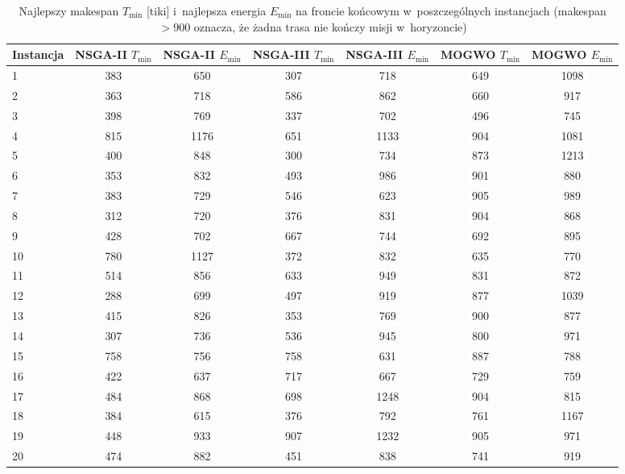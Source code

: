 \begin{table}[htbp]
    \centering
    \caption{Najlepszy makespan $T_{\min}$ [tiki] i~najlepsza energia $E_{\min}$ na froncie końcowym w~poszczególnych instancjach (makespan $> 900$ oznacza, że żadna trasa nie kończy misji w~horyzoncie)}
    \label{tab:per_run_objectives}
    \begin{tabular}{l c c c c c c}
        \hline
        Instancja & NSGA-II $T_{\min}$ & NSGA-II $E_{\min}$ & NSGA-III $T_{\min}$ & NSGA-III $E_{\min}$ & MOGWO $T_{\min}$ & MOGWO $E_{\min}$ \\
        \hline
        1 & 383 & 650 & 307 & 718 & 649 & 1098 \\
        2 & 363 & 718 & 586 & 862 & 660 & 917 \\
        3 & 398 & 769 & 337 & 702 & 496 & 745 \\
        4 & 815 & 1176 & 651 & 1133 & 904 & 1081 \\
        5 & 400 & 848 & 300 & 734 & 873 & 1213 \\
        6 & 353 & 832 & 493 & 986 & 901 & 880 \\
        7 & 383 & 729 & 546 & 623 & 905 & 989 \\
        8 & 312 & 720 & 376 & 831 & 904 & 868 \\
        9 & 428 & 702 & 667 & 744 & 692 & 895 \\
        10 & 780 & 1127 & 372 & 832 & 635 & 770 \\
        11 & 514 & 856 & 633 & 949 & 831 & 872 \\
        12 & 288 & 699 & 497 & 919 & 877 & 1039 \\
        13 & 415 & 826 & 353 & 769 & 900 & 877 \\
        14 & 307 & 736 & 536 & 945 & 800 & 971 \\
        15 & 758 & 756 & 758 & 631 & 887 & 788 \\
        16 & 422 & 637 & 717 & 667 & 729 & 759 \\
        17 & 484 & 868 & 698 & 1248 & 904 & 815 \\
        18 & 384 & 615 & 376 & 792 & 761 & 1167 \\
        19 & 448 & 933 & 907 & 1232 & 905 & 971 \\
        20 & 474 & 882 & 451 & 838 & 741 & 919 \\
        \hline
    \end{tabular}
\end{table}

\FloatBarrier

